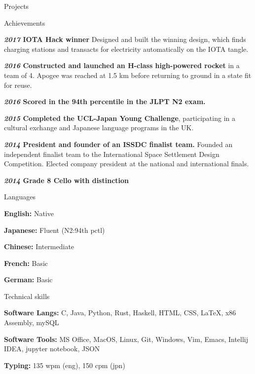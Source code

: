 \documentclass[10pt]{resume} %
\begin{document}
\begin{rSection}{Projects}
\begin{rSection}{Achievements}
    \item \textbf{\textit{2017} IOTA Hack winner} Designed and built the winning design, which finds charging stations and transacts for electricity automatically on the IOTA tangle.
    \item \textbf{\textit{2016} Constructed and launched an H-class high-powered rocket} in a team of 4. Apogee was reached at 1.5 km before returning to ground in a state fit for reuse.
    \item \textbf{\textit{2016} Scored in the 94th percentile in the JLPT N2 exam.}
    \item \textbf{\textit{2015} Completed the UCL-Japan Young Challenge}, participating in a cultural exchange and Japanese language programs in the UK.
    \item \textbf{\textit{2014} President and founder of an ISSDC finalist team.} Founded an independent finalist team to the International Space Settlement Design Competition. Elected company president at the national and international finals.
    \item \textbf{\textit{2014} Grade 8 Cello with distinction}
\end{rSection}

\begin{multicols}{3}


\begin{rSection}{Languages}
	\item \textbf{English:} Native
	\item \textbf{Japanese:} Fluent (N2:94th pctl)
	\item \textbf{Chinese:} Intermediate
	\item \textbf{French:} Basic
	\item \textbf{German:} Basic
\end{rSection}


\begin{rSection}{Technical skills}
    \item \textbf{Software Langs:}
        C,
        Java,
        Python,
        Rust,
        Haskell,
        HTML,
        CSS,
        \LaTeX,
        x86 Assembly,
        mySQL
    \item \textbf{Software Tools:}
        MS Office,
        MacOS,
        Linux,
        Git,
        Windows,
        Vim,
        Emacs,
        Intellij IDEA,
        jupyter notebook,
        JSON
    \item \textbf{Typing:} 135 wpm (eng), 150 cpm (jpn)
\end{rSection}


\end{multicols}
\end{rSection}
\end{document}
